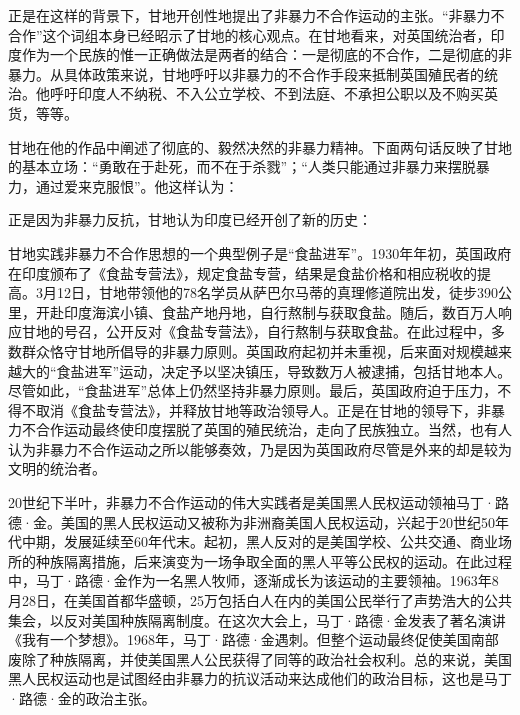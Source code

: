{{正是在这样的背景下，甘地开创性地提出了非暴力不合作运动的主张。“非暴力不合作”这个词组本身已经昭示了甘地的核心观点。在甘地看来，对英国统治者，印度作为一个民族的惟一正确做法是两者的结合：一是彻底的不合作，二是彻底的非暴力。从具体政策来说，甘地呼吁以非暴力的不合作手段来抵制英国殖民者的统治。他呼吁印度人不纳税、不入公立学校、不到法庭、不承担公职以及不购买英货，等等。

甘地在他的作品中阐述了彻底的、毅然决然的非暴力精神。下面两句话反映了甘地的基本立场：“勇敢在于赴死，而不在于杀戮”；“人类只能通过非暴力来摆脱暴力，通过爱来克服恨”。他这样认为：


正是因为非暴力反抗，甘地认为印度已经开创了新的历史：


甘地实践非暴力不合作思想的一个典型例子是“食盐进军”。1930年年初，英国政府在印度颁布了《食盐专营法》，规定食盐专营，结果是食盐价格和相应税收的提高。3月12日，甘地带领他的78名学员从萨巴尔马蒂的真理修道院出发，徒步390公里，开赴印度海滨小镇、食盐产地丹地，自行熬制与获取食盐。随后，数百万人响应甘地的号召，公开反对《食盐专营法》，自行熬制与获取食盐。在此过程中，多数群众恪守甘地所倡导的非暴力原则。英国政府起初并未重视，后来面对规模越来越大的“食盐进军”运动，决定予以坚决镇压，导致数万人被逮捕，包括甘地本人。尽管如此，“食盐进军”总体上仍然坚持非暴力原则。最后，英国政府迫于压力，不得不取消《食盐专营法》，并释放甘地等政治领导人。正是在甘地的领导下，非暴力不合作运动最终使印度摆脱了英国的殖民统治，走向了民族独立。当然，也有人认为非暴力不合作运动之所以能够奏效，乃是因为英国政府尽管是外来的却是较为文明的统治者。

20世纪下半叶，非暴力不合作运动的伟大实践者是美国黑人民权运动领袖马丁·路德·金。美国的黑人民权运动又被称为非洲裔美国人民权运动，兴起于20世纪50年代中期，发展延续至60年代末。起初，黑人反对的是美国学校、公共交通、商业场所的种族隔离措施，后来演变为一场争取全面的黑人平等公民权的运动。在此过程中，马丁·路德·金作为一名黑人牧师，逐渐成长为该运动的主要领袖。1963年8月28日，在美国首都华盛顿，25万包括白人在内的美国公民举行了声势浩大的公共集会，以反对美国种族隔离制度。在这次大会上，马丁·路德·金发表了著名演讲《我有一个梦想》。1968年，马丁·路德·金遇刺。但整个运动最终促使美国南部废除了种族隔离，并使美国黑人公民获得了同等的政治社会权利。总的来说，美国黑人民权运动也是试图经由非暴力的抗议活动来达成他们的政治目标，这也是马丁·路德·金的政治主张。

}}

